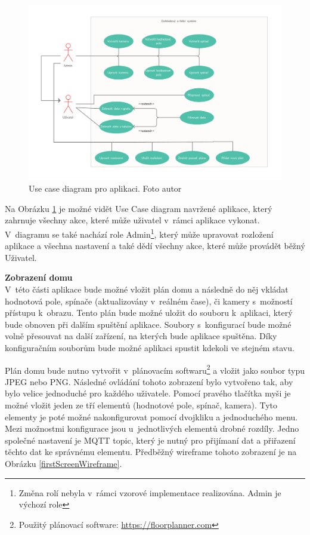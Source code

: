 \begin{figure}[H]
  \centering
  \includegraphics[width=\textwidth]{obrazky-figures/diagrams/useCaseDiagram.pdf}
  \caption{Use case diagram pro aplikaci. Foto autor}
  \label{useCaseApp}
\end{figure}

Na Obrázku \ref{useCaseApp} je možné vidět Use Case diagram navržené aplikace, který zahrnuje všechny akce, které může uživatel v~rámci aplikace vykonat. V~diagramu se také nachází role Admin\footnote{Změna rolí nebyla v~rámci vzorové implementace realizována. Admin je výchozí role}, který může upravovat rozložení aplikace a všechna nastavení a také dědí všechny akce, které může provádět běžný Uživatel.

\noindent\textbf{Zobrazení domu}\mbox{} \\
V~této části aplikace bude možné vložit plán domu a následně do něj vkládat hodnotová pole, spínače (aktualizovány v~reálném čase), či kamery s~možností přístupu k~obrazu. Tento plán bude možné uložit do souboru k~aplikaci, který bude obnoven při dalším spuštění aplikace. Soubory s~konfigurací bude možné volně přesouvat na další zařízení, na kterých bude aplikace spuštěna. Díky konfiguračním souborům bude možné aplikaci spustit kdekoli ve stejném stavu. 

Plán domu bude nutno vytvořit v~plánovacím softwaru\footnote{Použitý plánovací software: \url{https://floorplanner.com}} a vložit jako soubor typu JPEG nebo PNG.
Následné ovládání tohoto zobrazení bylo vytvořeno tak, aby bylo velice jednoduché pro každého uživatele. Pomocí pravého tlačítka myši je možné vložit jeden ze tří elementů (hodnotové pole, spínač, kamera). Tyto elementy je poté možné nakonfigurovat pomocí dvojkliku a jednoduchého menu. Mezi možnostmi konfigurace jsou u~jednotlivých elementů drobné rozdíly. Jedno společné nastavení je MQTT topic, který je nutný pro přijímaní dat a přiřazení těchto dat ke správnému elementu. Předběžný wireframe tohoto zobrazení je na Obrázku \ref{firstScreenWireframe}.

